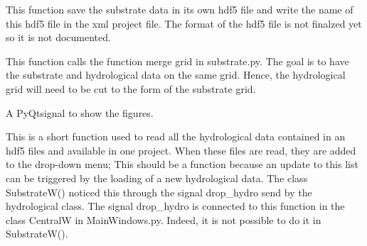 \documentclass[letterpaper,10pt,english]{sphinxmanual}
\begin{document}
\begin{fulllineitems}
\begin{fulllineitems}
\end{fulllineitems}


\begin{fulllineitems}
\label{\detokenize{index:src_GUI.hydro_GUI_2.SubstrateW.save_hdf5_sub}}
This function save the substrate data in its own hdf5 file and write the name of this hdf5 file in the
xml project file. The format of the hdf5 file is not finalzed yet so it is not documented.

\end{fulllineitems}


\begin{fulllineitems}
\label{\detokenize{index:src_GUI.hydro_GUI_2.SubstrateW.send_merge_grid}}
This function calls the function merge grid in substrate.py. The goal is to have the substrate and hydrological
data on the same grid. Hence, the hydrological grid will need to be cut to the form of the substrate grid.

\end{fulllineitems}


\begin{fulllineitems}
\label{\detokenize{index:src_GUI.hydro_GUI_2.SubstrateW.show_fig}}
A PyQtsignal to show the figures.

\end{fulllineitems}


\begin{fulllineitems}
\label{\detokenize{index:src_GUI.hydro_GUI_2.SubstrateW.update_hydro_hdf5_name}}
This is a short function used to read all the hydrological data contained in an hdf5 files and available in
one project. When these files are read, they are added to the drop-down menu;
This should be a function because an update to this list can be triggered by the loading of a new hydrological
data. The class SubstrateW() noticed this through the signal drop\_hydro send by the hydrological class.
The signal drop\_hydro is connected to this function in the class CentralW in MainWindows.py. Indeed, it is not
possible to do it in SubstrateW().

\end{fulllineitems}


\end{fulllineitems}
\end{document}
